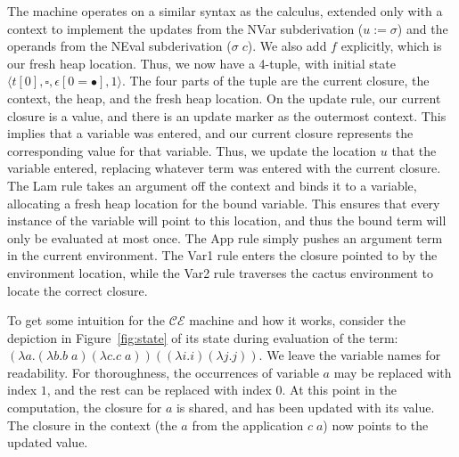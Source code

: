 The machine operates on a similar syntax as the calculus, extended only with a
context to implement the updates from the NVar subderivation ($u:=\sigma$) and
the operands from the NEval subderivation ($\sigma \; c$). We also add $f$
explicitly, which is our fresh heap location. Thus, we now have a 4-tuple, with
initial state $\langle t[0], \square, \epsilon[0=\bullet], 1\rangle$. The four
parts of the tuple are the current closure, the context, the heap, and the fresh
heap location. On the update rule, our current closure is a value, and there is
an update marker as the outermost context. This implies that a variable was
entered, and our current closure represents the corresponding value for that
variable.  Thus, we update the location $u$ that the variable entered, replacing
whatever term was entered with the current closure. The Lam rule takes an
argument off the context and binds it to a variable, allocating a fresh heap
location for the bound variable. This ensures that every instance of the
variable will point to this location, and thus the bound term will only be
evaluated at most once. The App rule simply pushes an argument term in the
current environment. The Var1 rule enters the closure pointed to by the
environment location, while the Var2 rule traverses the cactus environment to
locate the correct closure.  

To get some intuition for the $\mathcal{CE}$ machine and how it works, consider
the depiction in Figure~\ref{fig:state} of its state during evaluation of the
term: $(\lambda a.(\lambda b.b \; a) (\lambda c.c \; a)) ((\lambda i.i) (\lambda
j.j))$. We leave the variable names for readability. For thoroughness, the
occurrences of variable $a$ may be replaced with index $1$, and the rest can be
replaced with index $0$. At this point in the computation, the closure for $a$
is shared, and has been updated with its value. The closure in the context (the
$a$ from the application $c \; a$) now points to the updated value.

